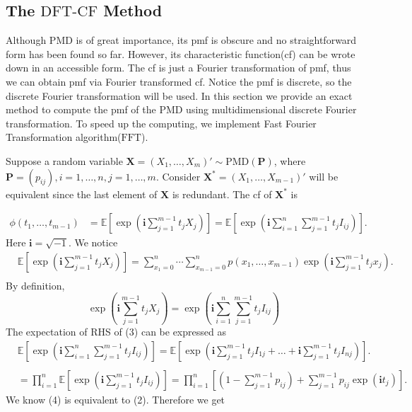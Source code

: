 \documentclass[12pt]{article}
\newcommand{\EE}{\mathbb{E}}
\newcommand{\Pmat}{\mathbf{P}}
\newcommand{\ivec}{{\boldsymbol{i}}}
\newcommand{\PMD}{\textrm{PMD}}
\newcommand{\Xvec}{\boldsymbol{X}}
\newcommand{\fft}{\textrm{FFT}}
\newcommand{\dft}{{\textrm{DFT-CF}}}
\begin{document}
\subsection{The $\dft$ Method}
Although $\PMD$ is of great importance, its pmf is obscure and no straightforward form has been found so far. However, its characteristic function(cf) can be wrote down in an accessible form. The cf is just a Fourier transformation of pmf, thus we can obtain pmf via Fourier transformed cf. Notice the pmf is discrete, so the discrete Fourier transformation will be used. In this section we provide an exact method to compute the pmf of the PMD using multidimensional discrete Fourier transformation. To speed up the computing, we implement Fast Fourier Transformation algorithm($\fft$). %

Suppose a random variable $\Xvec =  (X_1, \dots, X_{m})' \sim \PMD(\Pmat)$, where $\Pmat = (p_{ij}), i=1,\dots,n,j=1,\dots,m$. Consider $\Xvec^{\ast} = (X_1, \dots, X_{m-1})'$ will be equivalent since the last element of $\Xvec$ is redundant. The cf of $\Xvec^{\ast}$ is

\begin{align}
\phi(t_1, \dots, t_{m-1}) & = \EE\left[\exp\left(\ivec\sum_{j=1}^{m-1}t_jX_j\right)\right]=\EE\left[\exp\left(\ivec\sum_{i = 1}^n \sum_{j=1}^{m-1}t_j I_{ij}\right)\right].
\end{align}
Here $\ivec=\sqrt{-1}$. We notice
\begin{equation}
\begin{split}
  &\EE\left[\exp\left(\ivec\sum_{j=1}^{m-1}t_jX_j\right)\right] = \sum_{x_1 = 0}^{n}\cdots \sum_{x_{m-1} = 0}^n p(x_1,\ldots,x_{m-1})\exp\left(\ivec\sum_{j=1}^{m-1}t_jx_j\right).\\
\end{split}
\end{equation}
By definition,
\begin{equation}
\exp\left(\ivec\sum_{j=1}^{m-1}t_jX_j\right)= \exp\left(\ivec\sum_{i = 1}^n \sum_{j=1}^{m-1}t_j I_{ij}\right)
\end{equation}
The expectation of RHS of (3) can be expressed as
\begin{equation}
\begin{split}
  &\EE\left[\exp\left(\ivec\sum_{i = 1}^n \sum_{j=1}^{m-1}t_j I_{ij}\right)\right] = \EE\left[ \exp\left( \ivec\sum_{j=1}^{m-1} t_jI_{1j} + \dots + \ivec\sum_{j=1}^{m-1} t_jI_{nj}\right)\right].\\
  \\
  & = \prod_{i=1}^n \EE\left[ \exp\left( \ivec \sum_{j=1}^{m-1} t_j I_{ij}\right)\right] = \prod_{i=1}^n \left[(1 - \sum_{j=1}^{m-1}p_{ij})+\sum_{j=1}^{m-1}p_{ij}\exp(\ivec t_j)\right].
\end{split}
\end{equation}
We know (4) is equivalent to (2). Therefore we get
\end{document}
